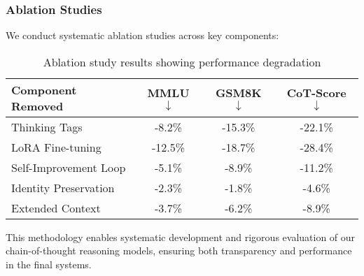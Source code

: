 \subsubsection{Ablation Studies}
We conduct systematic ablation studies across key components:

\begin{table}[H]
\centering
\begin{tabular}{lccc}
\toprule
Component Removed & MMLU $\downarrow$ & GSM8K $\downarrow$ & CoT-Score $\downarrow$ \\
\midrule
Thinking Tags & -8.2\% & -15.3\% & -22.1\% \\
LoRA Fine-tuning & -12.5\% & -18.7\% & -28.4\% \\
Self-Improvement Loop & -5.1\% & -8.9\% & -11.2\% \\
Identity Preservation & -2.3\% & -1.8\% & -4.6\% \\
Extended Context & -3.7\% & -6.2\% & -8.9\% \\
\bottomrule
\end{tabular}
\caption{Ablation study results showing performance degradation}
\label{tab:ablation}
\end{table}

This methodology enables systematic development and rigorous evaluation of our chain-of-thought reasoning models, ensuring both transparency and performance in the final systems.
